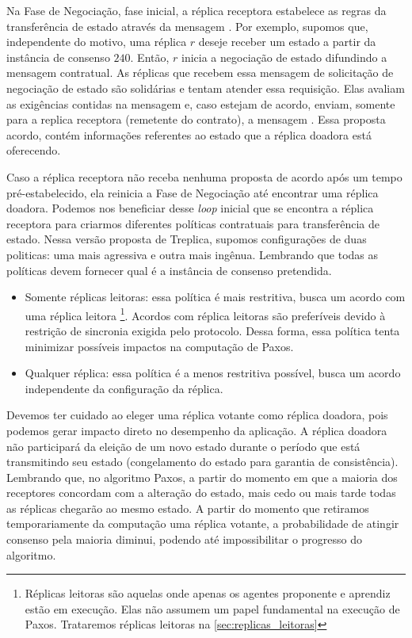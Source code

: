 Na Fase de Negociação, fase inicial, a réplica receptora estabelece as regras da
transferência de estado através da mensagem . Por exemplo,
supomos que, independente do motivo, uma réplica $r$ deseje receber um estado a partir da
instância de consenso $240$. Então, $r$ inicia a negociação de estado difundindo a
mensagem contratual. As réplicas que recebem essa mensagem de solicitação de negociação de
estado são solidárias e tentam atender essa requisição. Elas avaliam as exigências
contidas na mensagem e, caso estejam de acordo, enviam, somente para a replica receptora
(remetente do contrato), a mensagem . Essa proposta acordo, contém
informações referentes ao estado que a réplica doadora está oferecendo.

Caso a réplica receptora não receba nenhuma proposta de acordo após um tempo
pré-estabelecido, ela reinicia a Fase de Negociação até encontrar uma réplica doadora.
Podemos nos beneficiar desse \emph{loop} inicial que se encontra a réplica receptora para
criarmos diferentes políticas contratuais para transferência de estado. Nessa versão
proposta de Treplica, supomos configurações de duas politicas: uma mais agressiva e outra
mais ingênua. Lembrando que todas as políticas devem fornecer qual é a instância de
consenso pretendida.

\begin{itemize}
  \item Somente réplicas leitoras: essa política é mais restritiva, busca um acordo com
    uma réplica leitora \footnote{Réplicas leitoras são aquelas onde apenas os agentes
    proponente e aprendiz estão em execução. Elas não assumem um papel fundamental na
    execução de Paxos. Trataremos réplicas leitoras na \autoref{sec:replicas_leitoras}}.
    Acordos com réplica leitoras são preferíveis devido à restrição de sincronia exigida
    pelo protocolo. Dessa forma, essa política tenta minimizar possíveis impactos na
    computação de Paxos.
  \item Qualquer réplica: essa política é a menos restritiva possível, busca um acordo
    independente da configuração da réplica.
\end{itemize}

Devemos ter cuidado ao eleger uma réplica votante como réplica doadora, pois podemos gerar
impacto direto no desempenho da aplicação. A réplica doadora não participará da eleição de
um novo estado durante o período que está transmitindo seu estado (congelamento do estado
para garantia de consistência). Lembrando que, no algoritmo Paxos, a partir do momento em
que a maioria dos receptores concordam com a alteração do estado, mais cedo ou mais tarde
todas as réplicas chegarão ao mesmo estado. A partir do momento que retiramos
temporariamente da computação uma réplica votante, a probabilidade de atingir consenso
pela maioria diminui, podendo até impossibilitar o progresso do algoritmo.

